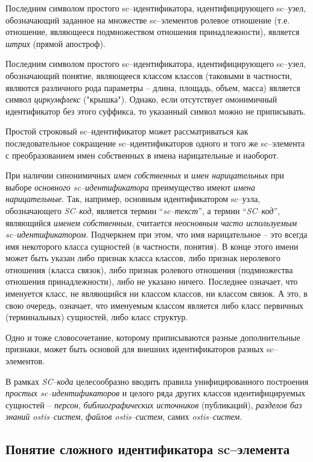 Последним символом простого sc--идентификатора, идентифицирующего sc--узел, обозначающий заданное на множестве sc--элементов ролевое отношение (т.е. отношение, являющееся подмножеством отношения принадлежности), является \textit{штрих} (прямой апостроф).

Последним символом простого sc--идентификатора, идентифицирующего sc--узел, обозначающий понятие, являющееся классом классов (таковыми в частности, являются различного рода параметры -- длина, площадь, объем, масса) является символ \textit{циркумфлекс} ("крышка"{}). Однако, если отсутствует омонимичный идентификатор без этого суффикса, то указанный символ можно не приписывать.

Простой строковый sc--идентификатор может рассматриваться как последовательное сокращение sc--идентификаторов одного и того же sc--элемента с преобразованием имен собственных в имена нарицательные и наоборот.

При наличии синонимичных \textit{имен собственных} и \textit{имен нарицательных} при выборе \textit{основного sc--идентификатора} преимущество имеют \textit{имена нарицательные}. Так, например, основным идентификатором sc--узла, обозначающего \textit{SC--код}, является термин ``\textit{sc--текст}'', а термин ``\textit{SC--код}'', являющийся \textit{именем собственным}, считается \textit{неосновным часто используемым sc--идентификатором}. Подчеркнем при этом, что имя нарицательное -- это всегда имя некоторого класса сущностей (в частности, понятия). В конце этого имени может быть указан либо признак класса классов, либо признак неролевого отношения (класса связок), либо признак ролевого отношения (подмножества отношения принадлежности), либо не указано ничего. Последнее означает, что именуется класс, не являющийся ни классом классов, ни классом связок. А это, в свою очередь, означает, что именуемым классом является либо класс первичных (терминальных) сущностей, либо класс структур.

Одно и тоже словосочетание, которому приписываются разные дополнительные признаки, может быть основой для внешних идентификаторов разных sc--элементов.

В рамках \textit{SC--кода} целесообразно вводить правила унифицированного построения \textit{простых sc--идентификаторов} и целого ряда других классов идентифицируемых сущностей -- \textit{персон}, \textit{библиографических источников} (публикаций), \textit{разделов баз знаний ostis--систем}, \textit{файлов ostis--систем}, самих \textit{ostis--систем}.


\subsection{Понятие сложного идентификатора sc--элемента}


